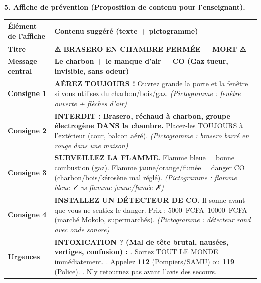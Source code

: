 \documentclass[11pt]{article}
\begin{document}
\begin{exoresolu}
\textbf{5. Affiche de prévention (Proposition de contenu pour l'enseignant).}
\begin{center}
\begin{tabularx}{\linewidth}{|X|X|}\hline
\rowcolor{popblueL}
\textbf{Élément de l'affiche} & \textbf{Contenu suggéré (texte + pictogramme)} \\ \hline
\textbf{Titre} & \textbf{⚠ BRASERO EN CHAMBRE FERMÉE = MORT ⚠} \\ \hline
\textbf{Message central} & \textbf{Le charbon + le manque d'air = CO (Gaz tueur, invisible, sans odeur)} \\ \hline
\textbf{Consigne 1} & \textbf{AÉREZ TOUJOURS !} \newline Ouvrez grande la porte et la fenêtre si vous utilisez du charbon/bois/gaz. \newline \textit{(Pictogramme : fenêtre ouverte + flèches d'air)} \\ \hline
\textbf{Consigne 2} & \textbf{INTERDIT : Brasero, réchaud à charbon, groupe électrogène DANS la chambre.} \newline Placez-les TOUJOURS à l'extérieur (cour, balcon aéré). \newline \textit{(Pictogramme : brasero barré en rouge dans une maison)} \\ \hline
\textbf{Consigne 3} & \textbf{SURVEILLEZ LA FLAMME.} \newline Flamme bleue = bonne combustion (gaz). Flamme jaune/orange/fumée = danger CO (charbon/bois/kérosène mal réglé). \newline \textit{(Pictogramme : flamme bleue ✓ vs flamme jaune/fumée ✗)} \\ \hline
\textbf{Consigne 4} & \textbf{INSTALLEZ UN DÉTECTEUR DE CO.} \newline Il sonne avant que vous ne sentiez le danger. Prix : \SIrange{5000}{10000}{FCFA} (marché Mokolo, supermarchés). \newline \textit{(Pictogramme : détecteur rond avec onde sonore)} \\ \hline
\textbf{Urgences} & \textbf{INTOXICATION ? (Mal de tête brutal, nausées, vertiges, confusion) :} \newline 1. Sortez TOUT LE MONDE immédiatement. \newline 2. Appelez \textbf{112} (Pompiers/SAMU) ou \textbf{119} (Police). \newline 3. N'y retournez pas avant l'avis des secours. \\ \hline
\end{tabularx}
\end{center}
\end{exoresolu}
\end{document}
